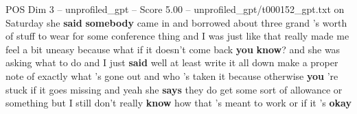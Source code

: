 \begin{textsample}{POS Dim 3 – unprofiled\_gpt – Score 5.00 – unprofiled\_gpt/t000152\_gpt.txt}  \label{ex:f3_pos_032}
on Saturday she \textbf{said} \textbf{somebody} came in and borrowed about three grand ’s worth of stuff to wear for some conference thing and I was just like that really made me feel a bit uneasy because what if it doesn't come back \textbf{you} \textbf{know}? and she was asking what to do and I just \textbf{said} well at least write it all down make a proper note of exactly what ’s gone out and who ’s taken it because otherwise \textbf{you} ’re stuck if it goes missing and yeah she \textbf{says} they do get some sort of allowance or something but I still don't really \textbf{know} how that ’s meant to work or if it ’s \textbf{okay}

\end{textsample}
